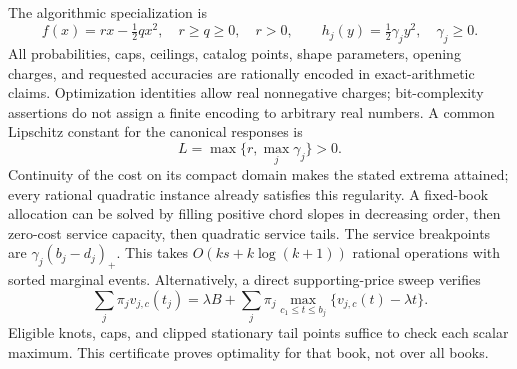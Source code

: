 The algorithmic specialization is
\begin{equation}\label{eq:quadratic52}
 f(x)=rx-\tfrac12 qx^2,\quad r\geq q\geq0,\quad r>0,\qquad h_j(y)=\tfrac12\gamma_jy^2,\quad \gamma_j\geq0.
\end{equation}
All probabilities, caps, ceilings, catalog points, shape parameters, opening charges, and requested accuracies are rationally encoded in exact-arithmetic claims. Optimization identities allow real nonnegative charges; bit-complexity assertions do not assign a finite encoding to arbitrary real numbers. A common Lipschitz constant for the canonical responses is
\begin{equation}\label{eq:L52}L=\max\{r,\max_j\gamma_j\}>0.\end{equation}
Continuity of the cost on its compact domain makes the stated extrema attained; every rational quadratic instance already satisfies this regularity. A fixed-book allocation can be solved by filling positive chord slopes in decreasing order, then zero-cost service capacity, then quadratic service tails. The service breakpoints are $\gamma_j(b_j-d_j)_+$. This takes $O(ks+k\log(k+1))$ rational operations with sorted marginal events. Alternatively, a direct supporting-price sweep verifies
\begin{equation}\label{eq:fixeddual52}
 \sum_j\pi_jv_{j,c}(t_j)=\lambda B+\sum_j\pi_j\max_{c_1\leq t\leq b_j}\{v_{j,c}(t)-\lambda t\}.
\end{equation}
Eligible knots, caps, and clipped stationary tail points suffice to check each scalar maximum. This certificate proves optimality for that book, not over all books.
